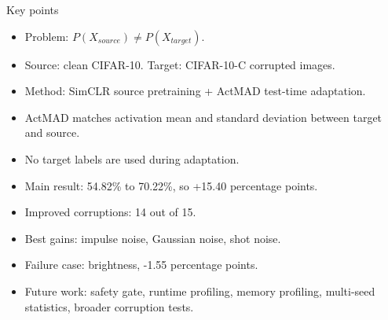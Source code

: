 \documentclass[11pt,a4paper]{article}
\begin{document}
\begin{notebox}{Key points}
\begin{itemize}
    \item Problem: $P(X_{source}) \neq P(X_{target})$.
    \item Source: clean CIFAR-10. Target: CIFAR-10-C corrupted images.
    \item Method: SimCLR source pretraining + ActMAD test-time adaptation.
    \item ActMAD matches activation mean and standard deviation between target and source.
    \item No target labels are used during adaptation.
    \item Main result: 54.82\% to 70.22\%, so +15.40 percentage points.
    \item Improved corruptions: 14 out of 15.
    \item Best gains: impulse noise, Gaussian noise, shot noise.
    \item Failure case: brightness, -1.55 percentage points.
    \item Future work: safety gate, runtime profiling, memory profiling, multi-seed statistics, broader corruption tests.
\end{itemize}
\end{notebox}
\end{document}
